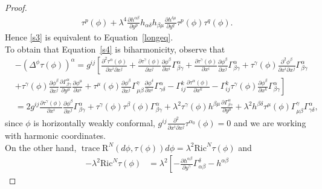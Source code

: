 \documentclass[12pt]{amsart}
\theoremstyle{plain}
\theoremstyle{definition}
\begin{document}
\begin{proof}
\begin{align*}
\tau^{p}(\phi) + \lambda^{4} \frac{\partial h^{\alpha\beta}}{\partial y^{p}}
h_{\alpha\delta}h_{\beta\mu} \frac{\partial h^{\delta\mu}}{\partial y^{q}}
\tau^{p}(\phi) \tau^{q}(\phi).
\end{align*}
Hence \eqref{s3} is equivalent to Equation~\eqref{longeq}.\\
To obtain that Equation~\eqref{s4} is biharmonicity, observe that
\begin{align*}
&- (\Delta^{\phi}  \tau(\phi) )^{\alpha}= g^{ij} \left[ \frac{\partial^{2}
\tau^{\alpha}(\phi)}{\partial x^{i}\partial x^{j}}  + \frac{\partial
\tau^{\gamma}(\phi)}{\partial x^{j}} \frac{\partial \phi^{\beta}}{\partial x^{i}}
\Gamma^{\alpha}_{\beta\gamma} + \frac{\partial \tau^{\gamma}(\phi)}{\partial x^{i}}
\frac{\partial \phi^{\beta}}{\partial x^{j}} \Gamma^{\alpha}_{\beta\gamma} +
\tau^{\gamma}(\phi) \frac{\partial^{2} \phi^{\beta}}{\partial
x^{i}\partial x^{j}} \Gamma^{\alpha}_{\beta\gamma} \right.\\
  &+ \left.
\tau^{\gamma}(\phi) \frac{\partial \phi^{\beta}}{\partial x^{j}} \frac{\partial
\Gamma^{\alpha}_{\beta\gamma}}{\partial y^{\mu}} \frac{\partial \phi^{\mu}}{\partial
x^{i}} + \tau^{\mu}(\phi) \frac{\partial \phi^{\beta}}{\partial x^{j}}
\Gamma^{\gamma}_{\mu\beta} \frac{\partial \phi^{\delta}}{\partial x^{i}}
\Gamma^{\alpha}_{\gamma\delta} - \Gamma^{k}_{ij} \frac{\partial
\tau^{\alpha}(\phi)}{\partial x^{k}}
  - \Gamma^{k}_{ij} \tau^{\gamma}(\phi)
\frac{\partial \phi^{\beta}}{\partial x^{k}}
\Gamma^{\alpha}_{\beta\gamma} \right] \\
& = 2 g^{ij} \frac{\partial \tau^{\gamma}(\phi)}{\partial x^{i}} \frac{\partial
\phi^{\beta}}{\partial x^{j}} \Gamma^{\alpha}_{\beta\gamma} + \tau^{\gamma}(\phi)
\tau^{\beta}(\phi) \Gamma^{\alpha}_{\beta\gamma} + \lambda^{2} \tau^{\gamma}(\phi)
h^{\beta\mu} \frac{\partial \Gamma^{\alpha}_{\beta\gamma}}{\partial y^{\mu}} +
\lambda^{2} h^{\beta\delta}\tau^{\mu}(\phi) \Gamma^{\gamma}_{\mu\beta}
\Gamma^{\alpha}_{\gamma\delta} ,
\end{align*}
since $\phi$ is {horizontally weakly conformal}, $g^{ij} \frac{\partial^{2} }{\partial x^{i} \partial x^{j}}
\tau^{\alpha_{0}}(\phi)=0$ and we are working with harmonic coordinates.\\
On the other hand, $\operatorname{trace}{{\mathrm R}^{N}(d\phi, \tau(\phi))d\phi} = \lambda^{2}
{\mathrm {Ric}}^{N} \tau(\phi)$ and
\begin{align*}
- \lambda^{2} {\mathrm {Ric}}^{N} \tau(\phi) &=  \lambda^{2} \left[ - \frac{\partial
h^{\alpha\beta}}{\partial y^{\gamma}} \Gamma^{\delta}_{\alpha\beta} - h^{\alpha\beta}

\end{align*}
\end{proof}
\end{document}
